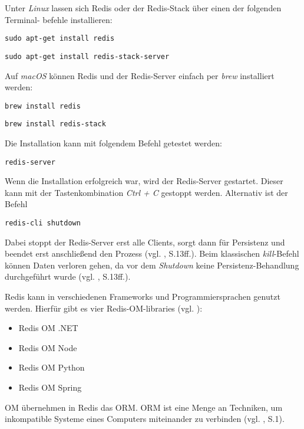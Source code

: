 Unter \textit{Linux} lassen sich \ac{Redis} oder der \ac{Redis}-Stack über einen der folgenden Terminal- befehle installieren:

\texttt{sudo apt-get install redis}

\texttt{sudo apt-get install redis-stack-server}

\vspace{0.4cm}

Auf \textit{macOS} können \ac{Redis} und der \ac{Redis}-Server einfach per \textit{brew} installiert werden:

\texttt{brew install redis}

\texttt{brew install redis-stack}

\vspace{0.4cm}

Die Installation kann mit folgendem Befehl getestet werden:

\texttt{redis-server}

Wenn die Installation erfolgreich war, wird der \ac{Redis}-Server gestartet. Dieser kann mit der Tastenkombination \textit{Ctrl + C} gestoppt werden. Alternativ ist der Befehl 

\texttt{redis-cli shutdown} 

Dabei stoppt der \ac{Redis}-Server erst alle Clients, sorgt dann für Persistenz und beendet erst anschließend den Prozess (vgl. \cite{3}, S.13ff.). Beim klassischen \textit{kill}-Befehl können Daten verloren gehen, da vor dem \textit{Shutdown} keine Persistenz-Behandlung durchgeführt wurde (vgl. \cite{3}, S.13ff.).

\ac{Redis} kann in verschiedenen Frameworks und Programmiersprachen genutzt werden. Hierfür gibt es vier \ac{Redis}-\acs{OM}-libraries (vgl. \cite{Redis-Docs-Redis-Stack}): 

\begin{itemize}
	\item Redis OM .NET
	\item Redis OM Node
	\item Redis OM Python
	\item Redis OM Spring
\end{itemize}

\ac{OM} übernehmen in \ac{Redis} das \ac{ORM}. \ac{ORM} ist eine Menge an Techniken, um inkompatible Systeme eines Computers miteinander zu verbinden (vgl. \cite{16}, S.1).





